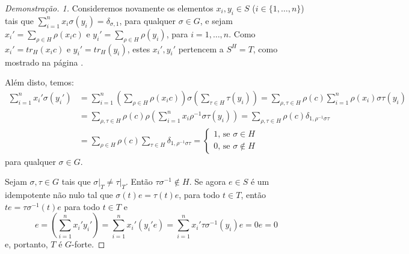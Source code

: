 \begin{teo}
\begin{proof}[Demonstração. 1]
Consideremos novamente os elementos $x_i, y_i \in S$ ($i\in\{1, \dots, n\}$) tais que $\sum_{i=1}^{n} x_i \sigma(y_i)=\delta_{\sigma, 1}$, para qualquer $\sigma \in G$, e sejam $x_i'= \sum_{\rho \in H} \rho(x_i c)$ e $y_i'=\sum_{\rho \in H} \rho(y_i)$, para $i=1,\dots,n$. Como $x_i' = tr_H(x_i c)$ e $y_i'=tr_H(y_i)$, estes $x_i',y_i'$ pertencem a $S^H = T$, como mostrado na página \pageref{def:traco}. \par 
Além disto, temos:
\begin{align*}
        \sum_{i=1}^{n}x_i'\sigma(y_i') &= \sum_{i=1}^{n} \left( \sum_{\rho \in H}\rho(x_i c) \right) \sigma \left(\sum_{\tau \in H}\tau(y_i) \right) = \sum_{\rho, \tau \in H}\rho(c)\sum_{i=1}^{n} \rho(x_i)\sigma\tau(y_i) \\
        &= \sum_{\rho, \tau \in H}\rho(c)\rho\left(\sum_{i=1}^{n} x_i\rho^{-1}\sigma\tau(y_i)\right) = \sum_{\rho, \tau \in H}\rho(c)\delta_{1,\rho^{-1}\sigma\tau} \\
        &= \sum_{\rho\in H} \rho(c) \sum_{\tau \in H}\delta_{1,\rho^{-1}\sigma\tau} = \begin{cases}
        1 \textrm{, se }\sigma \in H \\
        0 \textrm{, se } \sigma\not\in H
        \end{cases}
\end{align*}
para qualquer $\sigma \in G$. \par
Sejam $\sigma,\tau \in G$ tais que $\left.\sigma\right|_T \neq \left.\tau\right|_T$. Então $\tau\sigma^{-1}\not\in H$. Se agora $e \in S$ é um idempotente não nulo tal que $\sigma(t)e = \tau(t)e$, para todo $t\in T$, então $te = \tau\sigma^{-1}(t)e$ para todo $t\in T$ e
\[e = \left( \sum_{i=1}^{n} x_i'y_i' \right) = \sum_{i=1}^{n}x_i'(y_i'e) = \sum_{i=1}^{n}x_i' \tau\sigma^{-1}(y_i)e = 0e =0\]
e, portanto, $T$ é $G$-forte.
\end{proof}


\end{teo}
